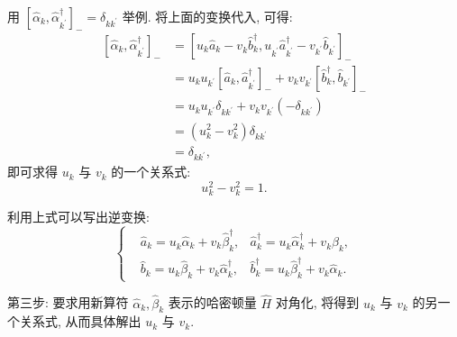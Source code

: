 用 $\left[\hat \alpha^{}_{k}, \hat \alpha_{k^{\prime}}^{\dagger}\right]_-=\delta_{k k^{\prime}}$ 举例. 将上面的变换代入, 可得:
\begin{align}
\left[\hat \alpha^{}_{k}, \hat \alpha_{k^{\prime}}^{\dagger}\right]_-&=\left[u_{k} \hat a_{k}-v^{}_{k} \hat b_{k}^{\dagger}, u^{}_{k^{\prime}} \hat a_{k^{\prime}}^{\dagger}-v_{k^{\prime}} \hat b_{k^{\prime}}\right]_-\nonumber\\
&=u_{k}u_{k^{\prime}}\left[\hat a^{}_{k}, \hat a_{k^{\prime}}^{\dagger}\right]_- + v_{k}v_{k^{\prime}}\left[\hat b^{\dagger}_{k}, \hat b^{}_{k^{\prime}}\right]_-\nonumber\\
&=u_{k}u_{k^{\prime}}\delta_{k k^{\prime}}+v_{k}v_{k^{\prime}}(-\delta_{k k^{\prime}})\nonumber\\
&=(u_{k}^2-v_{k}^2)\delta_{k k^{\prime}}\nonumber\\
&=\delta_{k k^{\prime}},
\end{align}
即可求得 $u_{k}$ 与 $v_{k}$ 的一个关系式:
\begin{equation}
u_{k}^{2}-v_{k}^{2}=1.
\end{equation}

利用上式可以写出逆变换:
\begin{equation}
\left\{\begin{aligned}
&\hat a^{}_{k}=u^{}_{k} \hat \alpha^{}_{k}+v_{k} \hat \beta_{k}^{\dagger}, & \hat a_{k}^{\dagger}=u^{}_{k} \hat \alpha_{k}^{\dagger}+v^{}_{k} \hat \beta^{}_{k} ,\\
&\hat b^{}_{k}=u^{}_{k} \hat \beta^{}_{k}+v_{k} \hat \alpha_{k}^{\dagger}, & \hat b_{k}^{\dagger}=u^{}_{k} \hat \beta_{k}^{\dagger}+v^{}_{k} \hat \alpha^{}_{k}.
\end{aligned}\right.
\end{equation}

第三步: 要求用新算符 $\hat \alpha_{k},\hat \beta_{k}$ 表示的哈密顿量 $\hat H$ 对角化, 将得到 $u_{k}$ 与 $v_{k}$ 的另一个关系式, 从而具体解出 $u_{k}$ 与 $v_{k}$. 

